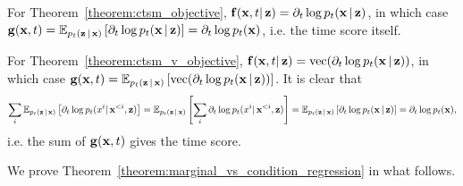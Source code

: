 For Theorem~\ref{theorem:ctsm_objective}, $\bbf(\bx,t|\bz)= \partial_{t}\log p_{t}(\bx|\bz)$, in which case $\bg(\bx,t)= \E_{p_{t}(\bz|\bx)}\left[\partial_{t}\log p_{t}(\bx|\bz)\right] = \partial_{t}\log p_{t}(\bx)$, i.e. the time score itself. 

For Theorem~\ref{theorem:ctsm_v_objective}, $\bbf(\bx,t|\bz)=\text{vec}(\partial_{t}\log p_{t}(\bx|\bz))$, in which case $\bg(\bx,t) = \E_{p_{t}(\bz|\bx)}\left[\text{vec}(\partial_{t}\log p_{t}(\bx|\bz))\right]$. It is clear that 
\begin{equation*}
\sum_{i}\E_{p_{t}(\bz|\bx)}\left[\partial_t \log p_t(x^i | \bx^{<i}, \bz)\right]=\E_{p_{t}(\bz|\bx)}\left[\sum_{i}\partial_t \log p_t(x^i | \bx^{<i}, \bz)\right] = \E_{p_{t}(\bz|\bx)}\left[\partial_{t}\log p_{t}(\bx|\bz)\right] = \partial_{t}\log p_{t}(\bx),
\end{equation*}
i.e. the sum of $\bg(\bx,t)$ gives the time score.

We prove Theorem~\ref{theorem:marginal_vs_condition_regression} in what follows.

